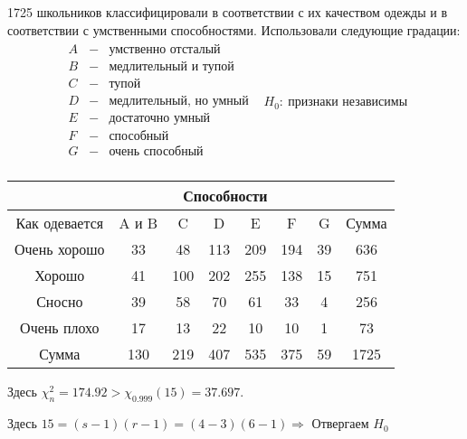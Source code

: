 \newpage
\begin{example}
    1725 школьников классифицировали в соответствии с их
    качеством одежды и в соответствии с умственными способностями.
    Использовали следующие градации:
    \[
    \begin{array}{lr}
        \begin{array}{lcl}
            A &-& \text{умственно отсталый} \\
            B &-& \text{медлительный и тупой} \\
            C &-& \text{тупой} \\
            D &-& \text{медлительный, но умный} \\
            E &-& \text{достаточно умный} \\
            F &-& \text{способный} \\
            G &-& \text{очень способный} \\
        \end{array} & 
        \boxed{H_0:\ \text{признаки независимы}}
    \end{array}
    \]
    \begin{table}[h]
        \centering
        \begin{tabular}{ c|c|c|c|c|c|c|c }
            & \multicolumn{6}{|c|}{Способности} & \\ \hline
            Как одевается & A и B & C   & D   & E   & F   & G  & Сумма \\ \hline
            Очень хорошо  &  33   & 48  & 113 & 209 & 194 & 39 & 636   \\ \hline
            Хорошо        &  41   & 100 & 202 & 255 & 138 & 15 & 751   \\ \hline
            Сносно        &  39   & 58  & 70  & 61  & 33  & 4  & 256   \\ \hline
            Очень плохо   &  17   & 13  & 22  & 10  & 10  & 1  & 73    \\ \hline
            Сумма         &  130  & 219 & 407 & 535 & 375 & 59 & 1725
        \end{tabular}
    \end{table}

    Здесь $\chi_n^2=174.92>\chi_{0.999}(15)=37.697$. \par
    Здесь $15 = (s-1)(r-1) = (4-3)(6-1) \Rightarrow$ Отвергаем $H_0$
\end{example}
